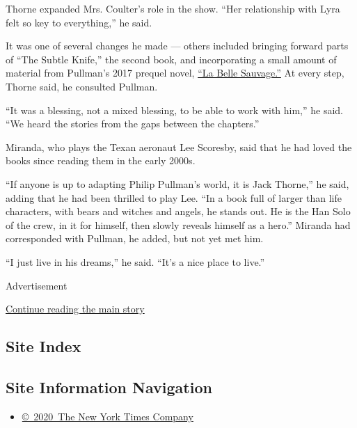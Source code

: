 Thorne expanded Mrs. Coulter's role in the show. ``Her relationship with
Lyra felt so key to everything,'' he said.

It was one of several changes he made --- others included bringing
forward parts of ``The Subtle Knife,'' the second book, and
incorporating a small amount of material from Pullman's 2017 prequel
novel,
\href{https://www.nytimes.com/2017/10/18/books/review-la-belle-sauvage-philip-pullman-book-of-dust.html}{``La
Belle Sauvage.''} At every step, Thorne said, he consulted Pullman.

``It was a blessing, not a mixed blessing, to be able to work with
him,'' he said. ``We heard the stories from the gaps between the
chapters.''

Miranda, who plays the Texan aeronaut Lee Scoresby, said that he had
loved the books since reading them in the early 2000s.

``If anyone is up to adapting Philip Pullman's world, it is Jack
Thorne,'' he said, adding that he had been thrilled to play Lee. ``In a
book full of larger than life characters, with bears and witches and
angels, he stands out. He is the Han Solo of the crew, in it for
himself, then slowly reveals himself as a hero.'' Miranda had
corresponded with Pullman, he added, but not yet met him.

``I just live in his dreams,'' he said. ``It's a nice place to live.''

Advertisement

\protect\hyperlink{after-bottom}{Continue reading the main story}

\hypertarget{site-index}{%
\subsection{Site Index}\label{site-index}}

\hypertarget{site-information-navigation}{%
\subsection{Site Information
Navigation}\label{site-information-navigation}}

\begin{itemize}
\tightlist
\item
  \href{https://help.nytimes.com/hc/en-us/articles/115014792127-Copyright-notice}{©~2020~The
  New York Times Company}
\end{itemize}

